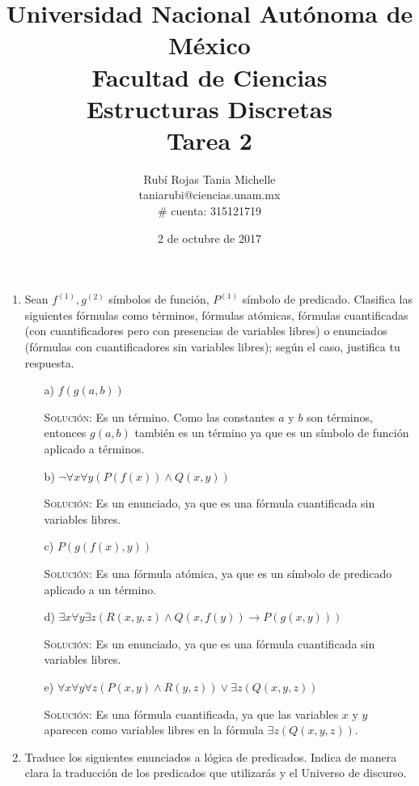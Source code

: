 \documentclass[letterpaper,11pt]{article}
\title{Universidad Nacional Autónoma de México \\
       Facultad de Ciencias \\
       Estructuras Discretas \\ 
       Tarea 2}
\author{Rubí Rojas Tania Michelle \\
        taniarubi@ciencias.unam.mx \\
        \# cuenta: 315121719}
\date{2 de octubre de 2017}
\begin{document}
\maketitle

\begin{enumerate}
    \item Sean $f^{(1)}, g^{(2)}$ símbolos de función, $P^{(1)}$ símbolo de 
    predicado. Clasifica las siguientes fórmulas como términos, fórmulas
    atómicas, fórmulas cuantificadas (con cuantificadores pero con presencias
    de variables libres) o enunciados (fórmulas con cuantificadores sin 
    variables libres); según el caso, justifica tu respuesta.

    \begin{itemize}
        \item[a)] $f(g(a,b))$

        \textsc{Solución:} Es un término. Como las constantes $a$ y $b$ son 
        términos, entonces $g(a,b)$ también es un término ya que es un símbolo 
        de función aplicado a términos. 

        \item[b)] $\neg ∀x ∀y (P(f(x)) \land Q(x, y))$

        \textsc{Solución:} Es un enunciado, ya que es una fórmula cuantificada 
        sin variables libres.

        \item[c)] $P(g(f(x), y))$

        \textsc{Solución:} Es una fórmula atómica, ya que es un símbolo de  
        predicado aplicado a un término.

        \item[d)] $∃x ∀y ∃z (R(x, y, z) \land Q(x, f(y)) → P(g(x,y)))$

        \textsc{Solución:} Es un enunciado, ya que es una fórmula cuantificada 
        sin variables libres.

        \item[e)] $∀x ∀y ∀z (P(x, y) \land R(y, z)) \lor ∃z (Q(x, y, z))$

        \textsc{Solución:} Es una fórmula cuantificada, ya que las variables 
        $x$ y $y$ aparecen como variables libres en la fórmula $∃z (Q(x, y, z))$.
    \end{itemize}

    \item Traduce los siguientes enunciados a lógica de predicados. Indica de  
    manera clara la traducción de los predicados que utilizarás y el Universo
    de discurso.


\end{enumerate}
\end{document}
